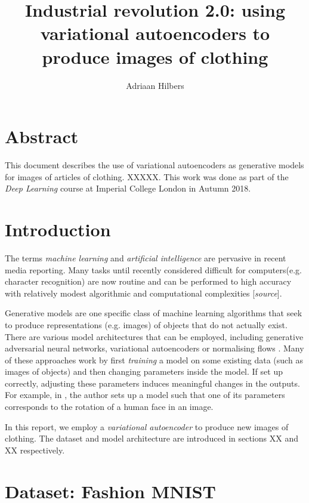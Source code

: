 \documentclass[]{article}
\title{Industrial revolution 2.0: using variational autoencoders to produce images of clothing}
\author{Adriaan Hilbers}
\begin{document}
\maketitle




\section*{Abstract}
\label{sec:abstrct}

This document describes the use of variational autoencoders as generative models for images of articles of clothing. XXXXX.
This work was done as part of the \textit{Deep Learning} course at Imperial College London in Autumn 2018.




\section{Introduction}
\label{sec:introduction}

The terms \textit{machine learning} and \textit{artificial intelligence} are pervasive in recent media reporting. Many tasks until recently considered difficult for computers(e.g. character recognition) are now routine and can be performed to high accuracy with relatively modest algorithmic and computational complexities [\textit{source}].

Generative models are one specific class of machine learning algorithms that seek to produce representations (e.g. images) of objects that do not actually exist. There are various model architectures that can be employed, including generative adversarial neural networks, variational autoencoders or normalising flows \cite{notes}. Many of these approaches work by first \textit{training} a model on some existing data (such as images of objects) and then changing parameters inside the model. If set up correctly, adjusting these parameters induces meaningful changes in the outputs. For example, in \cite{white}, the author sets up a model such that one of its parameters corresponds to the rotation of a human face in an image.

In this report, we employ a \textit{variational autoencoder} to produce new images of clothing. The dataset and model architecture are introduced in sections XX and XX respectively.




\section{Dataset: Fashion MNIST}
\label{sec:dataset}
\end{document}
